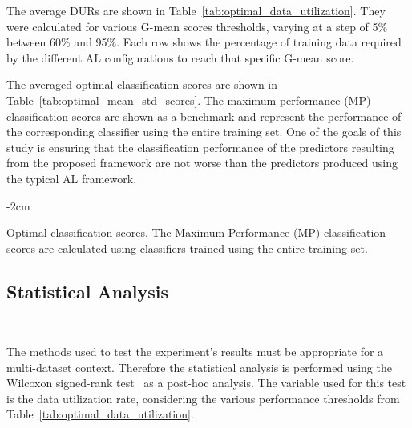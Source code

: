 \documentclass[preprint,12pt]{elsarticle}
\begin{document}
The average DURs are shown in Table~\ref{tab:optimal_data_utilization}. They
were calculated for various G-mean scores thresholds, varying at a step of 5\%
between 60\% and 95\%. Each row shows the percentage of training data required by the
different AL configurations to reach that specific G-mean score.


The averaged optimal classification scores are shown in
Table~\ref{tab:optimal_mean_std_scores}. The maximum performance (MP)
classification scores are shown as a benchmark and represent the performance
of the corresponding classifier using the entire training set. One of the
goals of this study is ensuring that the classification performance of the
predictors resulting from the proposed framework are not worse than the
predictors produced using the typical AL framework.

\begin{table}[H]
    \centering
    \addtolength{\leftskip} {-2cm}
    \addtolength{\rightskip}{-2cm}
    \caption{\label{tab:optimal_mean_std_scores}
        Optimal classification scores. The Maximum Performance (MP)
        classification scores are calculated using classifiers trained using
        the entire training set.
    }
\end{table}

\subsection{Statistical Analysis}~\label{sec:statistical-analysis}

The methods used to test the experiment's results must be appropriate for a
multi-dataset context. Therefore the statistical analysis is performed using
the Wilcoxon signed-rank
test~\cite{Wilcoxon1945} as a post-hoc analysis. The variable used for this
test is the data utilization rate, considering the various performance
thresholds from Table~\ref{tab:optimal_data_utilization}.
\end{document}
